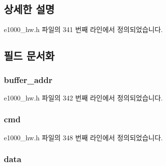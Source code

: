 \subsection{상세한 설명}


e1000\+\_\+hw.\+h 파일의 341 번째 라인에서 정의되었습니다.



\subsection{필드 문서화}
\subsubsection[{\texorpdfstring{buffer\+\_\+addr}{buffer_addr}}]{ buffer\+\_\+addr}\hypertarget{structe1000__data__desc_a87d79130b57fb21eedf04b9d3945c3d6}{}\label{structe1000__data__desc_a87d79130b57fb21eedf04b9d3945c3d6}


e1000\+\_\+hw.\+h 파일의 342 번째 라인에서 정의되었습니다.

\subsubsection[{\texorpdfstring{cmd}{cmd}}]{ cmd}\hypertarget{structe1000__data__desc_a0c40b83f263927828422c91c3e9828be}{}\label{structe1000__data__desc_a0c40b83f263927828422c91c3e9828be}


e1000\+\_\+hw.\+h 파일의 348 번째 라인에서 정의되었습니다.

\subsubsection[{\texorpdfstring{data}{data}}]{ data}\hypertarget{structe1000__data__desc_afc5d3d82c86bd8827a6251a93986acf8}{}\label{structe1000__data__desc_afc5d3d82c86bd8827a6251a93986acf8}


